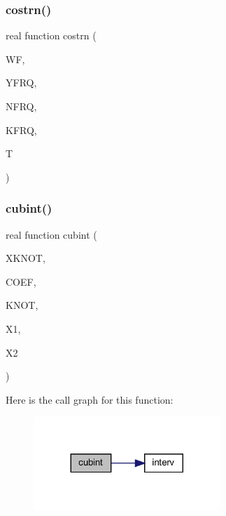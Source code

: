 \subsubsection{\texorpdfstring{costrn()}{costrn()}}
{\footnotesize\ttfamily real function costrn (\begin{DoxyParamCaption}\item[{real, dimension(nfrq), intent(in)}]{WF,  }\item[{real, dimension(4,nfrq), intent(in)}]{Y\+F\+RQ,  }\item[{integer, intent(in)}]{N\+F\+RQ,  }\item[{integer}]{K\+F\+RQ,  }\item[{real, intent(in)}]{T }\end{DoxyParamCaption})}

\mbox{\label{Marco_8f90_a0cebd439e7e54c21b37436ef4c5da9ca}} 
\subsubsection{\texorpdfstring{cubint()}{cubint()}}
{\footnotesize\ttfamily real function cubint (\begin{DoxyParamCaption}\item[{real, dimension(knot)}]{X\+K\+N\+OT,  }\item[{real, dimension(4,knot)}]{C\+O\+EF,  }\item[{integer}]{K\+N\+OT,  }\item[{real}]{X1,  }\item[{real}]{X2 }\end{DoxyParamCaption})}

Here is the call graph for this function\+:
\nopagebreak
\begin{figure}[H]
\begin{center}
\leavevmode
\includegraphics[width=200pt]{Marco_8f90_a0cebd439e7e54c21b37436ef4c5da9ca_cgraph}
\end{center}
\end{figure}
\mbox{\label{Marco_8f90_a108ddb07c94297e8965b149f8e8b0b10}} 
